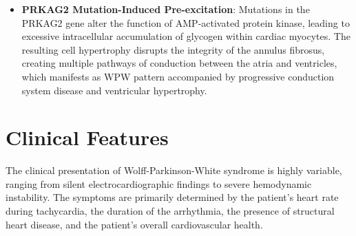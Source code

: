 \begin{itemize}
  \item \textbf{PRKAG2 Mutation-Induced Pre-excitation}: Mutations in the PRKAG2 gene alter the function of AMP-activated protein kinase, leading to excessive intracellular accumulation of glycogen within cardiac myocytes. The resulting cell hypertrophy disrupts the integrity of the annulus fibrosus, creating multiple pathways of conduction between the atria and ventricles, which manifests as WPW pattern accompanied by progressive conduction system disease and ventricular hypertrophy.
\end{itemize}

\section*{Clinical Features}
The clinical presentation of Wolff-Parkinson-White syndrome is highly variable, ranging from silent electrocardiographic findings to severe hemodynamic instability. The symptoms are primarily determined by the patient's heart rate during tachycardia, the duration of the arrhythmia, the presence of structural heart disease, and the patient's overall cardiovascular health.


